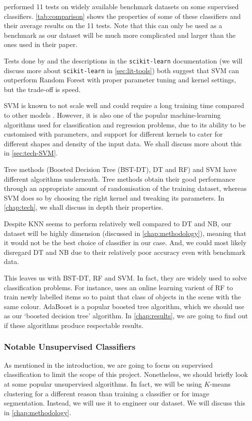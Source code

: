  performed 11 tests on widely available benchmark datasets on some supervised classifiers. \autoref{tab:comparison} shows the properties of some of these classifiers and their average results on the 11 tests. Note that this can only be used as a benchmark as our dataset will be much more complicated and larger than the ones used in their paper. 

Tests done by  and the descriptions in the \texttt{scikit-learn} documentation (we will discuss more about \texttt{scikit-learn} in \autoref{sec:lit-tools}) both suggest that SVM can outperform Random Forest with proper parameter tuning and kernel settings, but the trade-off is speed.

SVM is known to not scale well and could require a long training time compared to other models \cite{compare-supervised}. However, it is also one of the popular machine-learning algorithms used for classification and regression problems, due to its ability to be customised with parameters, and support for different kernels to cater for different shapes and density of the input data. We shall discuss more about this in \autoref{sec:tech-SVM}.

Tree methods (Boosted Decision Tree (BST-DT), DT and RF) and SVM have different algorithms underneath. Tree methods obtain their good performance through an appropriate amount of randomisation of the training dataset, whereas SVM does so by choosing the right kernel and tweaking its parameters. In \autoref{chap:tech}, we shall discuss in depth their properties.

Despite KNN seems to perform relatively well compared to DT and NB, our dataset will be highly dimension (discussed in \autoref{chap:methodology}), meaning that it would not be the best choice of classifier in our case. And, we could most likely disregard DT and NB due to their relatively poor accuracy even with benchmark data.

This leaves us with BST-DT, RF and SVM. In fact, they are widely used to solve classification problems. For instance, \cite{semantic-paint} uses an online learning varient of RF to train newly labelled items so to paint that class of objects in the scene with the same colour. AdaBoost is a popular boosted tree algorithm, which we should use as our `boosted decision tree' algorithm. In \autoref{chap:results}, we are going to find out if these algorithms produce respectable results.


\subsubsection{Notable Unsupervised Classifiers}
As mentioned in the introduction, we are going to focus on supervised classification to limit the scope of this project. Nonetheless, we should briefly look at some popular unsupervised algorithms. In fact, we will be using $K$-means clustering for a different reason than training a classifier or for image segmentation. Instead, we will use it to engineer our dataset. We will discuss this in \autoref{chap:methodology}.

